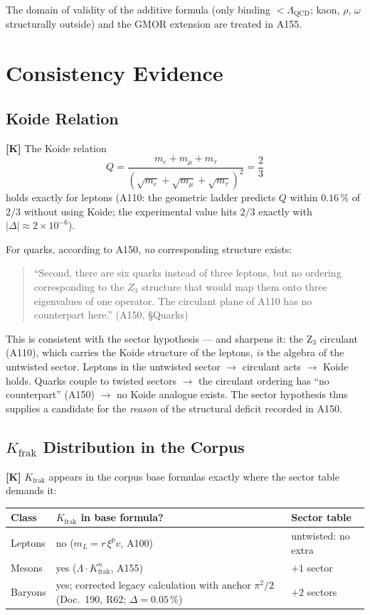 The domain of validity of the additive formula (only binding
$< \Lambda_\text{QCD}$; kaon, $\rho$, $\omega$ structurally outside)
and the GMOR extension are treated in A155.

\section{Consistency Evidence}

\subsection{Koide Relation}

\textbf{[K]} The Koide relation
\[
  Q = \frac{m_e+m_\mu+m_\tau}{(\sqrt{m_e}+\sqrt{m_\mu}+\sqrt{m_\tau})^2}
  = \frac{2}{3}
\]
holds exactly for leptons (A110: the geometric ladder predicts $Q$
within $0{.}16\,\%$ of $2/3$ without using Koide; the experimental
value hits $2/3$ exactly with $|\Delta| \approx 2\times10^{-6}$).

For quarks, according to A150, \emph{no} corresponding structure
exists:
\begin{quote}\small
``Second, there are six quarks instead of three leptons, but no
ordering corresponding to the $Z_3$ structure that would map them onto
three eigenvalues of one operator. The circulant plane of A110 has no
counterpart here.'' (A150, \S{}Quarks)
\end{quote}

This is consistent with the sector hypothesis --- and sharpens it: the
Z$_3$ circulant (A110), which carries the Koide structure of the
leptons, \emph{is} the algebra of the untwisted sector. Leptons in the
untwisted sector $\to$ circulant acts $\to$ Koide holds. Quarks couple
to twisted sectors $\to$ the circulant ordering has ``no counterpart''
(A150) $\to$ no Koide analogue exists. The sector hypothesis thus
supplies a candidate for the \emph{reason} of the structural deficit
recorded in A150.

\subsection{$K_\text{frak}$ Distribution in the Corpus}

\textbf{[K]} $K_\text{frak}$ appears in the corpus base formulas
exactly where the sector table demands it:

\begin{center}
\renewcommand{\arraystretch}{1.3}
{\small\begin{tabular}{lll}
\toprule
Class & $K_\text{frak}$ in base formula? & Sector table \\
\midrule
Leptons & no ($m_L = r\,\xi^{p}v$, A100) & untwisted: no extra \\
Mesons & yes ($\Lambda\cdot K_\text{frak}^{n}$, A155) & $+1$ sector \\
Baryons & yes; corrected legacy calculation with anchor $\pi^2/2$ (Doc.~190, R62; $\Delta=0{.}05\,\%$) & $+2$ sectors \\
\bottomrule
\end{tabular}}
\renewcommand{\arraystretch}{1.0}
\end{center}

